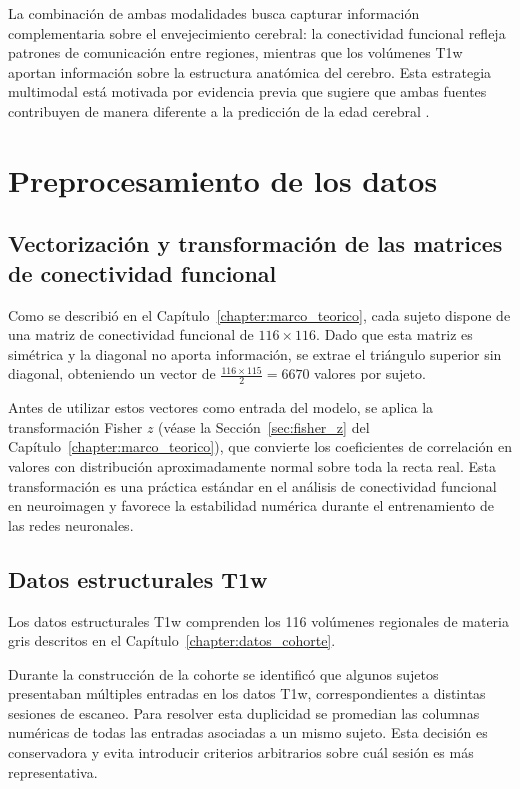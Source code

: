 La combinación de ambas modalidades busca capturar información complementaria sobre el envejecimiento cerebral: la conectividad funcional refleja patrones de comunicación entre regiones, mientras que los volúmenes T1w aportan información sobre la estructura anatómica del cerebro. Esta estrategia multimodal está motivada por evidencia previa que sugiere que ambas fuentes contribuyen de manera diferente a la predicción de la edad cerebral \cite{erus2015imaging, groves2012benefits}.

\section{Preprocesamiento de los datos}
\label{sec:preprocesamiento}

\subsection{Vectorización y transformación de las matrices de conectividad funcional}

Como se describió en el Capítulo~\ref{chapter:marco_teorico}, cada sujeto dispone de una matriz de conectividad funcional de $116 \times 116$. Dado que esta matriz es simétrica y la diagonal no aporta información, se extrae el triángulo superior sin diagonal, obteniendo un vector de $\frac{116 \times 115}{2} = 6670$ valores por sujeto.

Antes de utilizar estos vectores como entrada del modelo, se aplica la transformación Fisher $z$ (véase la Sección~\ref{sec:fisher_z} del Capítulo~\ref{chapter:marco_teorico}), que convierte los coeficientes de correlación en valores con distribución aproximadamente normal sobre toda la recta real. Esta transformación es una práctica estándar en el análisis de conectividad funcional en neuroimagen \cite{fisher1921probable} y favorece la estabilidad numérica durante el entrenamiento de las redes neuronales.

\subsection{Datos estructurales T1w}

Los datos estructurales T1w comprenden los 116 volúmenes regionales de materia gris descritos en el Capítulo~\ref{chapter:datos_cohorte}.

Durante la construcción de la cohorte se identificó que algunos sujetos presentaban múltiples entradas en los datos T1w, correspondientes a distintas sesiones de escaneo. Para resolver esta duplicidad se promedian las columnas numéricas de todas las entradas asociadas a un mismo sujeto. Esta decisión es conservadora y evita introducir criterios arbitrarios sobre cuál sesión es más representativa.

